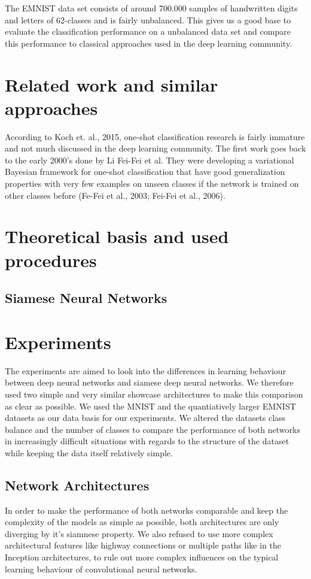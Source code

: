 \documentclass[a4paper,pt12]{article}
\begin{document}
The EMNIST data set consists of around 700.000 samples of handwritten digits and letters of 62-classes and is fairly unbalanced.
This gives us a good base to evaluate the classification performance on a unbalanced data set and compare this performance to classical approaches
used in the deep learning community.

\section{Related work and similar approaches}
According to Koch et. al., 2015, one-shot classification research is fairly immature and not much discussed in the deep learning
community. The first work goes back to the early 2000's done by Li Fei-Fei et al. They were developing a variational Bayesian framework for one-shot
classification that have good generalization properties with very few examples on unseen classes if the network is trained on other classes before (Fe-Fei et al., 2003; Fei-Fei et al., 2006).



\section{Theoretical basis and used procedures}

\subsection{Siamese Neural Networks}

\section{Experiments}
The experiments are aimed to look into the differences in learning behaviour between deep neural networks and siamese deep neural networks. We therefore used two simple and very similar showcase  architectures to make this comparison as clear as possible. We used the MNIST and the quantiatively larger EMNIST datasets as our data basis for our experiments. We altered the datasets class balance and the number of classes to compare the performance of both networks in increasingly difficult situations with regards to the structure of the dataset while keeping the data itself relatively simple.  

\subsection{Network Architectures}
In order to make the performance of both networks comparable and keep the complexity of the models as simple as possible, both architectures are only diverging by it's siamnese property. We also refused to use more complex architectural features like highway connections or multiple paths like in the Inception architectures, to rule out more complex influences on the typical learning behaviour of convolutional neural networks.
\end{document}
